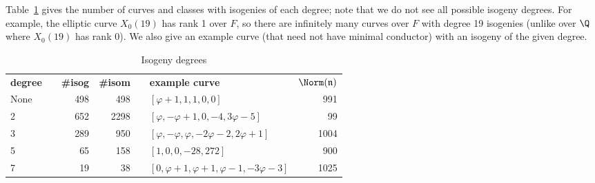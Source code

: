 \documentclass{amsart}
\newcommand{\n}{\mathfrak{n}}
\begin{document}
Table~\ref{table:degree} gives the number of curves and classes with
isogenies of each degree; note that we do not see all possible isogeny
degrees. For example, the elliptic curve $X_0(19)$ has rank 1 over $F$, so
there are infinitely many curves over $F$ with degree 19 isogenies
(unlike over $\Q$ where $X_0(19)$ has rank $0$).
We also give an example curve (that need not have minimal conductor)
with an isogeny of the given degree.
\begin{center}
\begin{table}[h]
\caption{Isogeny degrees\label{table:degree}}
\begin{tabular}{@{}lcrrclr@{}}\toprule
\textbf{degree} & \phantom{a} & \textbf{\#isog} & \textbf{\#isom} & \phantom{a} & \textbf{example curve} & $\Norm(\n)$ \\\cmidrule{1-1}\cmidrule{3-4}\cmidrule{6-7}
None & & 498 & 498  & & $[\varphi+1,1,1,0,0]$                               & 991  \\
2    & & 652 & 2298 & & $[\varphi,-\varphi+1,0,-4,3\varphi-5]$              & 99   \\
3    & & 289 & 950  & & $[\varphi,-\varphi,\varphi,-2\varphi-2,2\varphi+1]$ & 1004 \\
5    & & 65  & 158  & & $[1,0,0,-28,272]$                                   & 900  \\
7    & & 19  & 38   & & $[0,\varphi+1,\varphi+1,\varphi-1,-3\varphi-3]$     & 1025 \\\bottomrule
\end{tabular}
\end{table}
\end{center}
\end{document}
